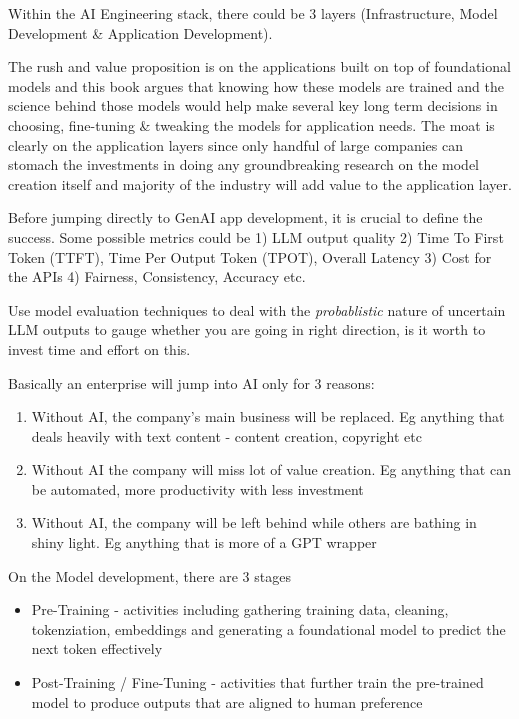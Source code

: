 \documentclass[
  letterpaper,
  DIV=11,
  numbers=noendperiod]{scrreprt}
\providecommand{\tightlist}{%
  \setlength{\itemsep}{0pt}\setlength{\parskip}{0pt}}\usepackage{longtable,booktabs,array}
\begin{document}
Within the AI Engineering stack, there could be 3 layers
(Infrastructure, Model Development \& Application Development).

The rush and value proposition is on the applications built on top of
foundational models and this book argues that knowing how these models
are trained and the science behind those models would help make several
key long term decisions in choosing, fine-tuning \& tweaking the models
for application needs. The moat is clearly on the application layers
since only handful of large companies can stomach the investments in
doing any groundbreaking research on the model creation itself and
majority of the industry will add value to the application layer.

Before jumping directly to GenAI app development, it is crucial to
define the success. Some possible metrics could be 1) LLM output quality
2) Time To First Token (TTFT), Time Per Output Token (TPOT), Overall
Latency 3) Cost for the APIs 4) Fairness, Consistency, Accuracy etc.

Use model evaluation techniques to deal with the \emph{probablistic}
nature of uncertain LLM outputs to gauge whether you are going in right
direction, is it worth to invest time and effort on this.

Basically an enterprise will jump into AI only for 3 reasons:

\begin{enumerate}
\def\labelenumi{\arabic{enumi})}
\tightlist
\item
  Without AI, the company's main business will be replaced. Eg anything
  that deals heavily with text content - content creation, copyright etc
\item
  Without AI the company will miss lot of value creation. Eg anything
  that can be automated, more productivity with less investment
\item
  Without AI, the company will be left behind while others are bathing
  in shiny light. Eg anything that is more of a GPT wrapper
\end{enumerate}

On the Model development, there are 3 stages

\begin{itemize}
\tightlist
\item
  Pre-Training - activities including gathering training data, cleaning,
  tokenziation, embeddings and generating a foundational model to
  predict the next token effectively
\item
  Post-Training / Fine-Tuning - activities that further train the
  pre-trained model to produce outputs that are aligned to human
  preference
\end{itemize}
\end{document}
